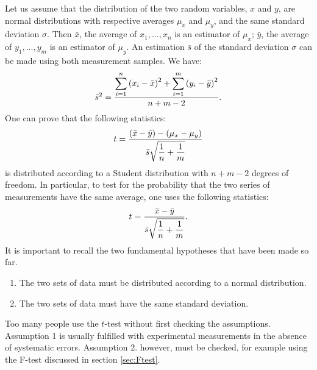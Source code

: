 Let us assume that the distribution of the two random variables,
$x$ and $y$, are normal distributions with respective averages
$\mu_x$ and $\mu_y$, and the same standard deviation $\sigma$.
Then $\bar{x}$, the average of $x_1,\ldots,x_n$ is an estimator of
$\mu_x$; $\bar{y}$, the average of $y_1,\ldots,y_m$ is an
estimator of $\mu_y$. An estimation $\bar{s}$ of the standard
deviation $\sigma$ can be made using both measurement samples. We
have:
\begin{equation}
\label{eq:sbart}
  \bar{s}^2={\displaystyle\sum_{i=1}^n\left(x_i-\bar{x}\right)^2
  + \sum_{i=1}^m\left(y_i-\bar{y}\right)^2\over\displaystyle n+m-2}.
\end{equation}
One can prove that the following statistics:
\begin{equation}
  t={\displaystyle \left(\bar{x}-\bar{y}\right)-\left(\mu_x
  -\mu_y\right)
  \over\displaystyle \bar{s}\sqrt{{1\over n}+{1\over m}}}
\end{equation}
is distributed according to a Student distribution with $n+m-2$
degrees of freedom. In particular, to test for the probability
that the two series of measurements have the same average, one
uses the following statistics:
\begin{equation}
\label{eq:tTest}
  t={\displaystyle \bar{x}-\bar{y}
  \over\displaystyle \bar{s}\sqrt{{1\over n}+{1\over m}}}.
\end{equation}
It is important to recall the two fundamental hypotheses that have
been made so far.
\begin{enumerate}
  \item The two sets of data must be distributed according to a normal distribution.
  \item The two sets of data must have the same standard deviation.
\end{enumerate}
Too many people use the $t$-test without first checking the
assumptions. Assumption 1 is usually fulfilled with experimental
measurements in the absence of systematic errors. Assumption 2.
however, must be checked, for example using the F-test discussed
in section \ref{sec:Ftest}.

